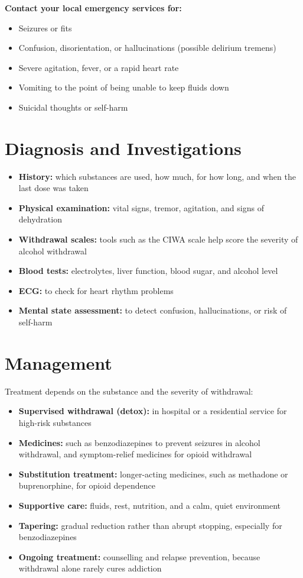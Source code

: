 \textbf{Contact your local emergency services for:}
\begin{itemize}
    \item Seizures or fits
    \item Confusion, disorientation, or hallucinations (possible delirium tremens)
    \item Severe agitation, fever, or a rapid heart rate
    \item Vomiting to the point of being unable to keep fluids down
    \item Suicidal thoughts or self-harm
\end{itemize}

\section*{Diagnosis and Investigations}
\begin{itemize}
    \item \textbf{History:} which substances are used, how much, for how long, and when the last dose was taken
    \item \textbf{Physical examination:} vital signs, tremor, agitation, and signs of dehydration
    \item \textbf{Withdrawal scales:} tools such as the CIWA scale help score the severity of alcohol withdrawal
    \item \textbf{Blood tests:} electrolytes, liver function, blood sugar, and alcohol level
    \item \textbf{ECG:} to check for heart rhythm problems
    \item \textbf{Mental state assessment:} to detect confusion, hallucinations, or risk of self-harm
\end{itemize}

\section*{Management}
Treatment depends on the substance and the severity of withdrawal:

\begin{itemize}
    \item \textbf{Supervised withdrawal (detox):} in hospital or a residential service for high-risk substances
    \item \textbf{Medicines:} such as benzodiazepines to prevent seizures in alcohol withdrawal, and symptom-relief medicines for opioid withdrawal
    \item \textbf{Substitution treatment:} longer-acting medicines, such as methadone or buprenorphine, for opioid dependence
    \item \textbf{Supportive care:} fluids, rest, nutrition, and a calm, quiet environment
    \item \textbf{Tapering:} gradual reduction rather than abrupt stopping, especially for benzodiazepines
    \item \textbf{Ongoing treatment:} counselling and relapse prevention, because withdrawal alone rarely cures addiction
\end{itemize}

